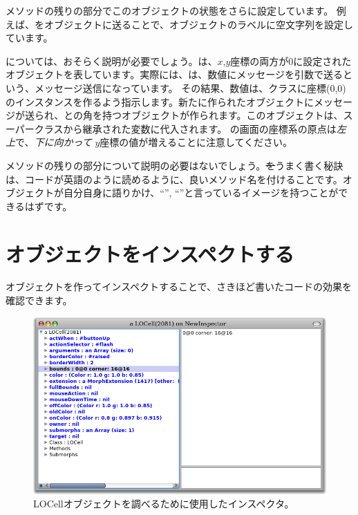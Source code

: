 \documentclass[a4paper,10pt,twoside]{book}
\begin{document}
メソッドの残りの部分でこのオブジェクトの状態をさらに設定しています。
例えば、をオブジェクトに送ることで、オブジェクトのラベルに空文字列を設定しています。

については、おそらく説明が必要でしょう。は、$x$,$y$座標の両方が0に設定されたオブジェクトを表しています。実際には、は、数値にメッセージを引数で送るという、メッセージ送信になっています。
その結果、数値は、クラスに座標(0,0)のインスタンスを作るよう指示します。新たに作られたオブジェクトにメッセージが送られ、との角を持つオブジェクトが作られます。このオブジェクトは、スーパークラスから継承された変数に代入されます。
\pharo の画面の座標系の原点は\emph{左上}で、\emph{下に向かって} $y$座標の値が増えることに注意してください。

メソッドの残りの部分について説明の必要はないでしょう。\st をうまく書く秘訣は、コードが英語のように読めるように、良いメソッド名を付けることです。オブジェクトが自分自身に語りかけ、``'', ``''と言っているイメージを持つことができるはずです。

\section{オブジェクトをインスペクトする}

オブジェクトを作ってインスペクトすることで、さきほど書いたコードの効果を確認できます。


\begin{figure}[htbp]
   \centering
   \includegraphics[width=\textwidth]{LOCellInspector}
   \caption{LOCellオブジェクトを調べるために使用したインスペクタ。}
\end{figure}
\end{document}
